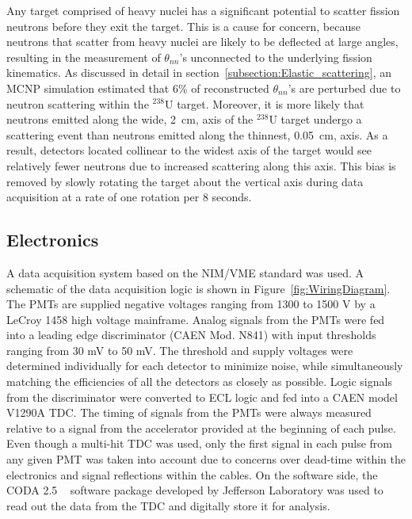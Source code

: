 Any target comprised of heavy nuclei has a significant potential to scatter fission neutrons before they exit the target.
This is a cause for concern, because neutrons that scatter from heavy nuclei are likely to be deflected at large angles, resulting in the measurement of $\theta_{nn}$'s unconnected to the underlying fission kinematics.
As discussed in detail in section~\ref{subsection:Elastic_scattering}, an MCNP simulation estimated that 6\% of reconstructed $\theta_{nn}$'s are perturbed due to neutron scattering within the $^{238}$U target.
Moreover, it is more likely that neutrons emitted along the wide, 2~cm, axis of the $^{238}$U target undergo a scattering event than neutrons emitted along the thinnest, 0.05~cm, axis.
As a result, detectors located collinear to the widest axis of the target would see relatively fewer neutrons due to increased scattering along this axis. 
This bias is removed by slowly rotating the target about the vertical axis during data acquisition at a rate of one rotation per 8 seconds.

\subsection{Electronics}
\label{sec:electronics}
A data acquisition system based on the NIM/VME standard was used.
A schematic of the data acquisition logic is shown in Figure~\ref{fig:WiringDiagram}.
The PMTs are supplied negative voltages ranging from 1300 to 1500 V by a LeCroy 1458 high voltage mainframe.
Analog signals from the PMTs were fed into a leading edge discriminator (CAEN Mod. N841) with input thresholds ranging from 30 mV to 50 mV.
The threshold and supply voltages were determined individually for each detector to minimize noise, while simultaneously matching the efficiencies of all the detectors as closely as possible.
Logic signals from the discriminator were converted to ECL logic and fed into a CAEN model V1290A TDC.
The timing of signals from the PMTs were always measured relative to a signal from the accelerator provided at the beginning of each pulse.
Even though a multi-hit TDC was used, only the first signal in each pulse from any given PMT was taken into account due to concerns over dead-time within the electronics and signal reflections within the cables.
On the software side, the CODA 2.5 ~\cite{CODA} software package developed by Jefferson Laboratory was used to read out the data from the TDC and digitally store it for analysis.

